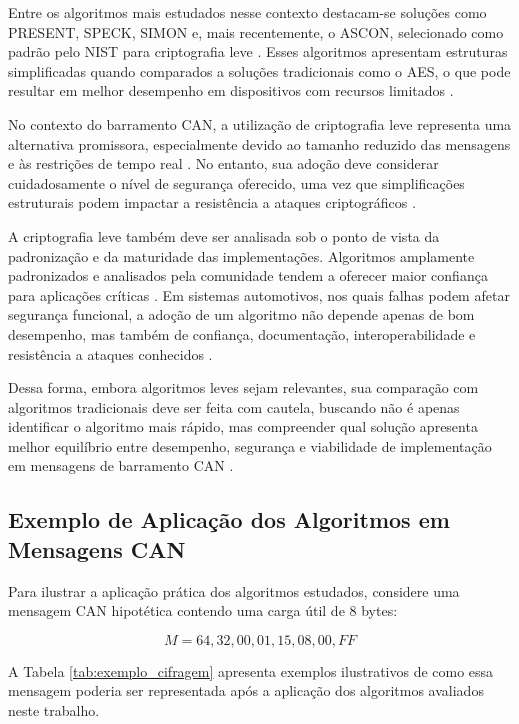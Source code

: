 Entre os algoritmos mais estudados nesse contexto destacam-se soluções como PRESENT, SPECK, SIMON e, mais recentemente, o ASCON, selecionado como padrão pelo NIST para criptografia leve \cite{bogdanov2007present,biryukov2014differential,dobraunig2021ascon}. Esses algoritmos apresentam estruturas simplificadas quando comparados a soluções tradicionais como o AES, o que pode resultar em melhor desempenho em dispositivos com recursos limitados \cite{sadkhan2018survey}.

No contexto do barramento CAN, a utilização de criptografia leve representa uma alternativa promissora, especialmente devido ao tamanho reduzido das mensagens e às restrições de tempo real \cite{sagstetter2013security}. No entanto, sua adoção deve considerar cuidadosamente o nível de segurança oferecido, uma vez que simplificações estruturais podem impactar a resistência a ataques criptográficos \cite{manifavas2013lightweight}.

A criptografia leve também deve ser analisada sob o ponto de vista da padronização e da maturidade das implementações. Algoritmos amplamente padronizados e analisados pela comunidade tendem a oferecer maior confiança para aplicações críticas \cite{kaur2025survey}. Em sistemas automotivos, nos quais falhas podem afetar segurança funcional, a adoção de um algoritmo não depende apenas de bom desempenho, mas também de confiança, documentação, interoperabilidade e resistência a ataques conhecidos \cite{ponsard2016goal}.

Dessa forma, embora algoritmos leves sejam relevantes, sua comparação com algoritmos tradicionais deve ser feita com cautela, buscando não é apenas identificar o algoritmo mais rápido, mas compreender qual solução apresenta melhor equilíbrio entre desempenho, segurança e viabilidade de implementação em mensagens de barramento CAN \cite{iqbal2025design}.

\subsection{Exemplo de Aplicação dos Algoritmos em Mensagens CAN}

Para ilustrar a aplicação prática dos algoritmos estudados, considere uma mensagem CAN hipotética contendo uma carga útil de 8 bytes:

\begin{equation}
M = {64, 32, 00, 01, 15, 08, 00, FF}
\end{equation}

A Tabela \ref{tab:exemplo_cifragem} apresenta exemplos ilustrativos de como essa mensagem poderia ser representada após a aplicação dos algoritmos avaliados neste trabalho.

